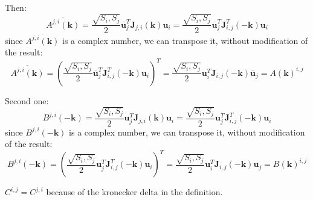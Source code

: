 Then:
\begin{equation}
    \overline{A^{j,i}(\boldsymbol{k})} = \dfrac{\sqrt{S_i, S_j}}{2}\overline{\boldsymbol{u}}^T_j\boldsymbol{J}_{j,i}(\boldsymbol{k})\boldsymbol{u}_i = 
    \dfrac{\sqrt{S_i, S_j}}{2}\overline{\boldsymbol{u}}^T_j\boldsymbol{J}_{i,j}^T(-\boldsymbol{k})\boldsymbol{u}_i
\end{equation}
since $\overline{A^{j,i}(\boldsymbol{k})}$ is a complex number, we can transpose it, without modification of the result:
\begin{equation}
    \overline{A^{j,i}(\boldsymbol{k})} =  (\dfrac{\sqrt{S_i, S_j}}{2}\overline{\boldsymbol{u}}^T_j\boldsymbol{J}_{i,j}^T(-\boldsymbol{k})\boldsymbol{u}_i)^T =
    \dfrac{\sqrt{S_i, S_j}}{2}\boldsymbol{u}^T_i\boldsymbol{J}_{i,j}(-\boldsymbol{k})\overline{\boldsymbol{u}}_j = A(\boldsymbol{k})^{i,j}
\end{equation}

Second one:
\begin{equation}
    B^{j,i}(-\boldsymbol{k}) = \dfrac{\sqrt{S_i, S_j}}{2}\boldsymbol{u}^T_j\boldsymbol{J}_{j,i}(\boldsymbol{k})\boldsymbol{u}_i =
    \dfrac{\sqrt{S_i, S_j}}{2}\boldsymbol{u}^T_j\boldsymbol{J}_{i,j}^T(-\boldsymbol{k})\boldsymbol{u}_i
\end{equation}
since $B^{j,i}(-\boldsymbol{k})$ is a complex number, we can transpose it, without modification of the result:
\begin{equation}
    B^{j,i}(-\boldsymbol{k}) =  (\dfrac{\sqrt{S_i, S_j}}{2}\boldsymbol{u}^T_j\boldsymbol{J}_{i,j}^T(-\boldsymbol{k})\boldsymbol{u}_i)^T =
    \dfrac{\sqrt{S_i, S_j}}{2}\boldsymbol{u}^T_i\boldsymbol{J}_{i,j}(-\boldsymbol{k})\boldsymbol{u}_j = B(\boldsymbol{k})^{i,j}
\end{equation}

$C^{i,j} = C^{j,i}$ because of the kronecker delta in the definition.
